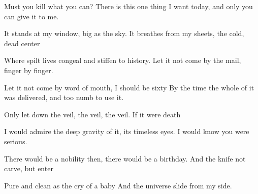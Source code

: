 \documentclass[10pt]{article}
\begin{document}
\begin{poem}
  \begin{stanza}
    Must you kill what you can?\verseline
    There is this one thing I want today, and only you can give it to me.
  \end{stanza}
  \begin{stanza}
    It stands at my window, big as the sky.\verseline
    It breathes from my sheets, the cold, dead center
  \end{stanza}
  \begin{stanza}
    Where spilt lives congeal and stiffen to history.\verseline
    Let it not come by the mail, finger by finger.
  \end{stanza}
  \begin{stanza}
    Let it not come by word of mouth, I should be sixty\verseline
    By the time the whole of it was delivered, and too numb to use it.
  \end{stanza}
  \begin{stanza}
    Only let down the veil, the veil, the veil.\verseline
    If it were death
  \end{stanza}
  \begin{stanza}
    I would admire the deep gravity of it, its timeless eyes.\verseline
    I would know you were serious.
  \end{stanza}
  \begin{stanza}
    There would be a nobility then, there would be a birthday.\verseline
    And the knife not carve, but enter
  \end{stanza}
  \begin{stanza}
    Pure and clean as the cry of a baby\verseline
    And the universe slide from my side.
  \end{stanza}
\end{poem}
\end{document}

